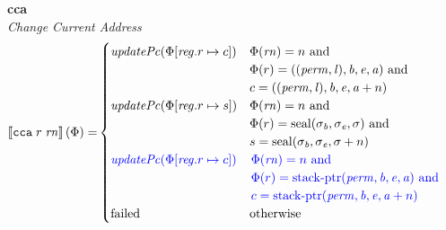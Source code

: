 \documentclass[a4paper]{article}
\begin{document}
\noindent\textbf{cca}\\
\emph{Change Current Address}
\\
\begin{align*}
  \sem{\tcca{r}{\rn}}(\Phi) = & 
                                  \begin{cases}
                                    \updPcAddr{\Phi\updReg{r}{c}} &  
                                    \arraycolsep=0pt
                                    \begin{array}[t]{l}
                                      \Phi(\rn) = n \tand \\
                                      \Phi(r) = ((\perm,\lin),\baddr,\eaddr,\aaddr) \tand \\
                                      c = ((\perm,\lin),\baddr,\eaddr,\aaddr + n)
                                    \end{array}
                                    \\
                                    \updPcAddr{\Phi\updReg{r}{s}} &  
                                    \arraycolsep=0pt
                                    \begin{array}[t]{l}
                                      \Phi(\rn) = n \tand \\
                                      \Phi(r) = \seal{\sigma_\baddr,\sigma_\eaddr,\sigma} \tand \\
                                      s = \seal{\sigma_\baddr,\sigma_\eaddr,\sigma + n}
                                    \end{array}
                                    \\
                                    \src{\updPcAddr{\Phi\updReg{r}{c}}} &  
                                    \sourcecolor\left.
                                    \arraycolsep=0pt
                                    \begin{array}[t]{l}
                                      \Phi(\rn) = n\tand \\
                                      \Phi(r) = \stkptr{\perm,\baddr,\eaddr,\aaddr} \tand \\
                                      c = \stkptr{\perm,\baddr,\eaddr,\aaddr + n}
                                    \end{array}\right.
                                    \\
                                    \failed & \totherwise
                                  \end{cases}
\end{align*}
\end{document}
